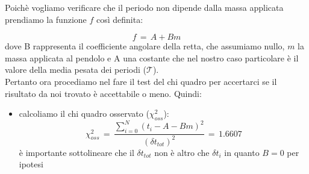 Poichè vogliamo verificare che il periodo non dipende dalla massa applicata prendiamo la funzione $f$ così definita:

\begin{equation*}
	f \,=\, A + B m 
\end{equation*}
%
dove B rappresenta il coefficiente angolare della retta, che assumiamo nullo, $m$ la massa applicata al pendolo e A una costante che nel nostro caso particolare è il valore della media pesata dei periodi ($\mathcal{T}$).\\
Pertanto ora procediamo nel fare il test del chi quadro per accertarci se il risultato da noi trovato è accettabile o meno. Quindi:
\begin{itemize}
	\item{calcoliamo il chi quadro osservato ($\chi_{oss}^2$):
			\begin{equation*}
				\chi_{oss}^2 \,=\, \frac{\sum_{i=0}^{N} (t_i - A - B m)^2}{(\delta t_{tot})^2} \,=\, 1.6607
			\end{equation*}
			è importante sottolineare che il $\delta t_{tot}$ non è altro che $\delta t_i$ in quanto $B = 0$ per ipotesi
			}
\end{itemize}